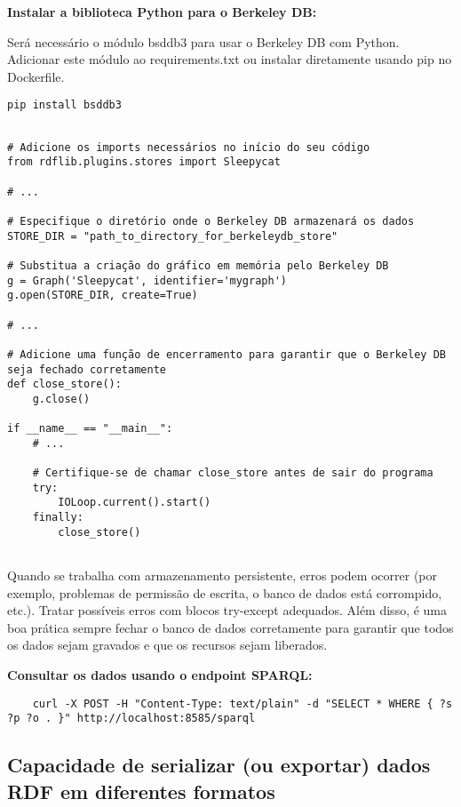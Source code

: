 \textbf{Instalar a biblioteca Python para o Berkeley DB:}

Será necessário o módulo bsddb3 para usar o Berkeley DB com Python. Adicionar este módulo ao requirements.txt ou instalar diretamente usando pip no Dockerfile.
\begin{verbatim}
pip install bsddb3
\end{verbatim}

\begin{verbatim}

# Adicione os imports necessários no início do seu código
from rdflib.plugins.stores import Sleepycat

# ...

# Especifique o diretório onde o Berkeley DB armazenará os dados
STORE_DIR = "path_to_directory_for_berkeleydb_store"

# Substitua a criação do gráfico em memória pelo Berkeley DB
g = Graph('Sleepycat', identifier='mygraph')
g.open(STORE_DIR, create=True)

# ...

# Adicione uma função de encerramento para garantir que o Berkeley DB seja fechado corretamente
def close_store():
    g.close()

if __name__ == "__main__":
    # ...

    # Certifique-se de chamar close_store antes de sair do programa
    try:
        IOLoop.current().start()
    finally:
        close_store()
    
\end{verbatim}

Quando se trabalha com armazenamento persistente, erros podem ocorrer (por exemplo, problemas de permissão de escrita, o banco de dados está corrompido, etc.). Tratar possíveis erros com blocos try-except adequados. Além disso, é uma boa prática sempre fechar o banco de dados corretamente para garantir que todos os dados sejam gravados e que os recursos sejam liberados.

\textbf{Consultar os dados usando o endpoint SPARQL:}
\begin{verbatim}
    curl -X POST -H "Content-Type: text/plain" -d "SELECT * WHERE { ?s ?p ?o . }" http://localhost:8585/sparql
\end{verbatim}

\subsection{Capacidade de serializar (ou exportar) dados RDF em diferentes formatos}

